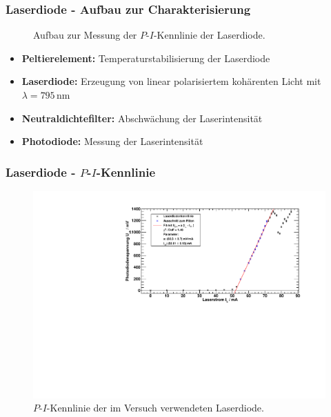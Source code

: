 \begin{frame}
\frametitle{Laserdiode - Aufbau zur Charakterisierung}
\begin{figure}
    \centering
    \def\svgwidth{\textwidth}
    
    \caption{Aufbau zur Messung der $P$-$I$-Kennlinie der Laserdiode.}
\end{figure}
\begin{itemize}
  \item \textbf{Peltierelement:} Temperaturstabilisierung der Laserdiode
  \item \textbf{Laserdiode:} Erzeugung von linear polarisiertem kohärenten Licht mit $\lambda=795$\,nm
  \item \textbf{Neutraldichtefilter:} Abschwächung der Laserintensität
  \item \textbf{Photodiode:} Messung der Laserintensität
\end{itemize}
\end{frame}

\begin{frame}
\frametitle{Laserdiode - $P$-$I$-Kennlinie}

\begin{figure}[H]
    \begin{center}
        \includegraphics[width=\textwidth]{../img/diodenkennlinie.pdf}
        \caption{$P$-$I$-Kennlinie der im Versuch verwendeten Laserdiode.}
    \end{center}
\end{figure}
\end{frame}

